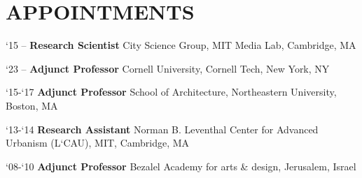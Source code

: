 \section*{APPOINTMENTS}

\begin{tablist}

    \item[`15 --]\tab\textbf{Research Scientist}
    City Science Group, MIT Media Lab, Cambridge, MA

    \item[`23 --]\tab\textbf{Adjunct Professor}
    Cornell University, Cornell Tech, New York, NY

    \item[`15-`17]\tab\textbf{Adjunct Professor}
    School of Architecture, Northeastern University, Boston, MA

    \item[`13-`14]\tab\textbf{Research Assistant}
    Norman B. Leventhal Center for Advanced Urbanism (L`CAU), MIT, Cambridge, MA


    \item[`08-`10]\tab\textbf{Adjunct Professor}
    Bezalel Academy for arts \& design, Jerusalem, Israel


\end{tablist}
